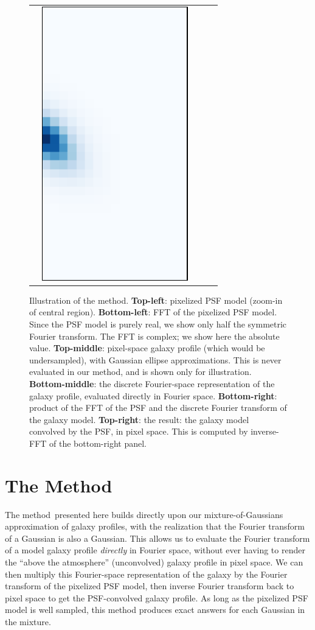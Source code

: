 \documentclass[11pt,preprint]{aastex}
\newcommand{\trick}{method}
\newcommand{\Trick}{Method}
\begin{document}
\begin{figure}
\begin{center}
\begin{tabular}{@{}c@{}c@{}c@{}c@{}c@{}}
      &
      \multicolumn{1}{r}{%
        \includegraphics[height=0.22\textwidth]{psf-03}}
    \end{tabular}
  \end{center}
  \caption{\label{fig:example}%
    Illustration of the \trick.
    \textbf{Top-left}: pixelized PSF model (zoom-in of central region).
    \textbf{Bottom-left}: FFT of the pixelized PSF model.  Since the PSF model is
    purely real, we show only half the symmetric Fourier transform. The FFT is
    complex; we show here the absolute value.
    \textbf{Top-middle}: pixel-space galaxy profile (which would be
    undersampled), with Gaussian ellipse approximations.  This is
    never evaluated in our method, and is shown only for illustration.
    \textbf{Bottom-middle}: the discrete Fourier-space representation of the
    galaxy profile, evaluated directly in Fourier space.
    \textbf{Bottom-right}: product of the FFT of the PSF and the
    discrete Fourier transform of the galaxy model.
    \textbf{Top-right}: the result: the galaxy model convolved by the
    PSF, in pixel space.  This is computed by inverse-FFT of the
    bottom-right panel.
  }
\end{figure}

\section{The \Trick}

The \trick\ presented here builds directly upon our mixture-of-Gaussians
approximation of galaxy profiles, with the realization that the
Fourier transform of a Gaussian is also a Gaussian.  This allows us to
evaluate the Fourier transform of a model galaxy profile \emph{directly} in Fourier
space, without ever having to render the ``above the atmosphere''
(unconvolved) galaxy profile in pixel space.
We can then multiply this Fourier-space
representation of the galaxy by the Fourier transform of the pixelized
PSF model, then inverse Fourier transform back to pixel space to get
the PSF-convolved galaxy profile.
%
As long as the pixelized PSF model is well sampled, this method produces
exact answers for each Gaussian in the mixture.
\end{document}
